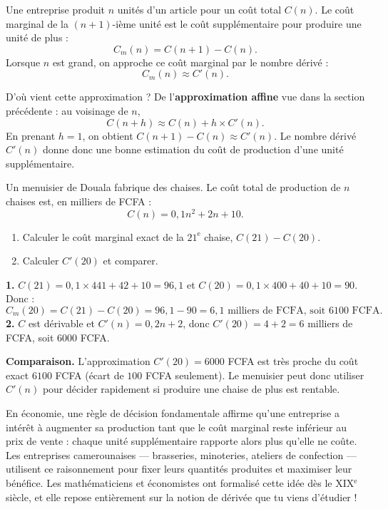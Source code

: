 \documentclass[11pt]{article}
\newcommand{\cle}[1]{{\popxbold\color{popdark}#1}}
\newcounter{popsec}
\newcounter{popsub}
\newcommand{\courssub}[1]{%
  \stepcounter{popsub}%
  \par\vspace{9pt}\noindent{\popxbold\fontsize{11.5}{13}\selectfont\color{popink}{\color{poporange}\thepopsec.\thepopsub}\hspace{6pt}#1}\par\nopagebreak\vspace{4pt}
}
\begin{document}
\courssub{Coût marginal en économie}

\begin{definition}
Une entreprise produit $n$ unités d'un article pour un coût total $C(n)$. Le \cle{coût marginal} de la $(n+1)$-ième unité est le coût supplémentaire pour produire une unité de plus :
\[ C_{m}(n) = C(n+1) - C(n). \]
Lorsque $n$ est grand, on approche ce coût marginal par le nombre dérivé :
\[ C_{m}(n) \approx C'(n). \]
\end{definition}

D'où vient cette approximation ? De l'\textbf{approximation affine} vue dans la section précédente : au voisinage de $n$,
\[ C(n + h) \approx C(n) + h \times C'(n). \]
En prenant $h = 1$, on obtient $C(n+1) - C(n) \approx C'(n)$. Le nombre dérivé $C'(n)$ donne donc une bonne estimation du coût de production d'une unité supplémentaire.

\begin{exoresolu}
Un menuisier de Douala fabrique des chaises. Le coût total de production de $n$ chaises est, en milliers de FCFA :
\[ C(n) = 0{,}1n^{2} + 2n + 10. \]
\begin{enumerate}
\item Calculer le coût marginal exact de la $21^{\text{e}}$ chaise, $C(21) - C(20)$.
\item Calculer $C'(20)$ et comparer.
\end{enumerate}
\tcblower
\textbf{1.} $C(21) = 0{,}1 \times 441 + 42 + 10 = 96{,}1$ et $C(20) = 0{,}1 \times 400 + 40 + 10 = 90$. Donc :
\[ C_{m}(20) = C(21) - C(20) = 96{,}1 - 90 = 6{,}1 \text{ milliers de FCFA, soit } 6100 \text{ FCFA}. \]
\textbf{2.} $C$ est dérivable et $C'(n) = 0{,}2n + 2$, donc $C'(20) = 4 + 2 = 6$ milliers de FCFA, soit $6000$ FCFA.

\textbf{Comparaison.} L'approximation $C'(20) = 6000$ FCFA est très proche du coût exact $6100$ FCFA (écart de $100$ FCFA seulement). Le menuisier peut donc utiliser $C'(n)$ pour décider rapidement si produire une chaise de plus est rentable.
\end{exoresolu}

\begin{savaistu}
En économie, une règle de décision fondamentale affirme qu'une entreprise a intérêt à augmenter sa production tant que le coût marginal reste inférieur au prix de vente : chaque unité supplémentaire rapporte alors plus qu'elle ne coûte. Les entreprises camerounaises — brasseries, minoteries, ateliers de confection — utilisent ce raisonnement pour fixer leurs quantités produites et maximiser leur bénéfice. Les mathématiciens et économistes ont formalisé cette idée dès le XIX$^{\text{e}}$ siècle, et elle repose entièrement sur la notion de dérivée que tu viens d'étudier !
\end{savaistu}
\end{document}
